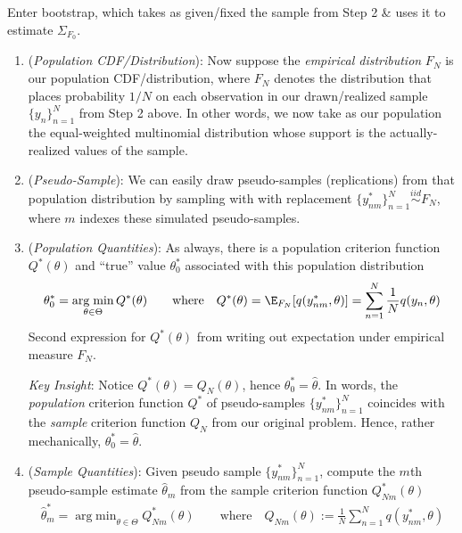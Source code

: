 \documentclass[12pt]{article}
\theoremstyle{plain}
\theoremstyle{definition}
\theoremstyle{remark}
\DeclareMathOperator*{\argmin}{arg\;min}
\newcommand{\iid}{\overset{iid}{\sim}}
\newcommand{\sumnN}{\sum^N_{n=1}}
\newcommand{\nN}{_{n=1}^N}
\begin{document}
Enter bootstrap, which takes as given/fixed the sample from Step 2
\& uses it to estimate $\Sigma_{F_0}$.
\begin{enumerate}
  \item (\emph{Population CDF/Distribution}):
    Now suppose the \emph{empirical distribution} $F_N$ is our
    population CDF/distribution, where $F_N$ denotes the distribution
    that places probability $1/N$ on each observation in our
    drawn/realized sample $\{y_n\}\nN$ from Step 2 above.
    In other words, we now take as our population the equal-weighted
    multinomial distribution whose support is the actually-realized
    values of the sample.

  \item (\emph{Pseudo-Sample}):
    We can easily draw pseudo-samples (replications) from that
    population distribution by sampling with with replacement
    $\{y_{nm}^*\}\nN\iid F_N$, where $m$ indexes these simulated
    pseudo-samples.

  \item (\emph{Population Quantities}):
    As always, there is a population criterion function $Q^*(\theta)$
    and ``true'' value $\theta^*_0$ associated with this population
    distribution
    \begin{align*}
      \theta_0^*
      =
      \argmin_{\theta\in\Theta}
      Q^*(\theta)
      \qquad\text{where}\quad
      Q^*(\theta)
      =
      \E_{F_N}[q(y_{nm}^*,\theta)]
      =
      \sumnN
      \frac{1}{N}
      q(y_n,\theta)
    \end{align*}
    Second expression for $Q^*(\theta)$ from writing out
    expectation under empirical measure $F_N$.

    \emph{Key Insight}: Notice $Q^*(\theta)=Q_N(\theta)$, hence
    $\theta_0^*=\hat{\theta}$.
    In words, the \emph{population} criterion function $Q^*$ of
    pseudo-samples $\{y_{nm}^*\}\nN$ coincides with the \emph{sample}
    criterion function $Q_N$ from our original problem.
    Hence, rather mechanically, $\theta_0^*=\hat{\theta}$.

  \item (\emph{Sample Quantities}):
    Given  pseudo sample $\{y^*_{nm}\}\nN$, compute the $m$th
    pseudo-sample estimate $\hat{\theta}_m$ from the sample criterion
    function $Q_{Nm}^*(\theta)$
    \begin{align*}
      \hat{\theta}_m^*
      = \argmin_{\theta\in\Theta}
      Q_{Nm}^*(\theta)
      \qquad\text{where}\quad
      Q_{Nm}(\theta)
      :=
      \frac{1}{N}
      \sumnN
      q(y_{nm}^*,\theta)
    \end{align*}


\end{enumerate}
\end{document}
